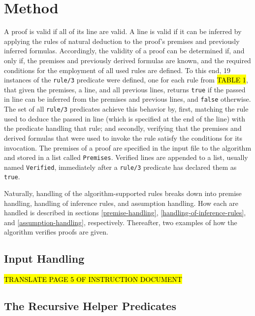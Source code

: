 \documentclass[a4paper, 11pt]{article}
\begin{document}
   \section{Method}
   
   A proof is valid if all of its line are valid. A line is
   valid if it can be inferred by applying the rules of
   natural deduction to the proof's premises and previously
   inferred formulas. Accordingly, the validity of a proof can
   be determined if, and only if, the premises and previously
   derived formulas are known, and the required conditions for
   the employment of all used rules are defined. To this end,
   19 instances of the \texttt{rule/3} predicate were defined,
   one for each rule from \hl{TABLE 1}, that given the
   premises, a line, and all previous lines, returns 
   \texttt{true} if the passed in line can be inferred from
   the premises and previous lines, and \texttt{false}
   otherwise. The set of all \texttt{rule/3} predicates 
   achieve this behavior by, first, matching the rule used to
   deduce the passed in line (which is specified at the end 
   of the line) with the predicate handling that rule; and
   secondly, verifying that the premises and derived formulas 
   that were used to invoke the rule satisfy the conditions 
   for its invocation. The premises of a proof are specified
   in the input file to the algorithm and stored in a list
   called \texttt{Premises}. Verified lines are appended to a 
   list, usually named \texttt{Verified}, immediately after a
   \texttt{rule/3} predicate has declared them as
   \texttt{true}.
   \bigbreak

   Naturally, handling of the algorithm-supported rules breaks
   down into premise handling, handling of inference rules,
   and assumption handling. How each are handled is
   described in sections 
   \ref{premise-handling},
   \ref{handling-of-inference-rules}, and
   \ref{assumption-handling}, respectively. 
   Thereafter, two examples of how the algorithm verifies
   proofs are given.

   \subsection{Input Handling}
   \label{input-handling}
   \hl{TRANSLATE PAGE 5 OF INSTRUCTION DOCUMENT}

   \subsection{The Recursive Helper Predicates}
   \label{recursive-helper-predicates}
\end{document}
